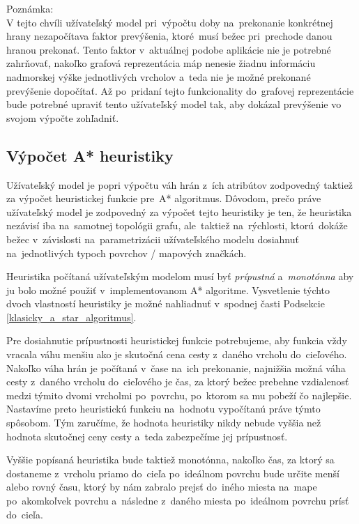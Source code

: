 Poznámka:\\
V tejto chvíli užívateľský model pri~výpočtu doby na~prekonanie konkrétnej hrany nezapočítava faktor prevýšenia, ktoré~musí bežec pri~prechode danou hranou prekonať. Tento faktor v~aktuálnej podobe aplikácie nie je potrebné zahrňovať, nakoľko grafová reprezentácia máp nenesie žiadnu informáciu nadmorskej výške jednotlivých vrcholov a~teda nie je možné prekonané prevýšenie dopočítať. Až po~pridaní tejto funkcionality do~grafovej reprezentácie bude potrebné upraviť tento užívateľský model tak, aby dokázal prevýšenie vo svojom výpočte zohľadniť.  

\subsection{Výpočet A* heuristiky}\label{vypocet_a_star_heuristiky}

Užívateľský model je popri výpočtu váh hrán z~ích atribútov zodpovedný taktiež za výpočet heuristickej funkcie pre~A* algoritmus. Dôvodom, prečo práve užívateľský model je zodpovedný za výpočet tejto heuristiky je ten, že heuristika nezávisí iba na~samotnej topológii grafu, ale~taktiež na~rýchlosti, ktorú~dokáže bežec v~závislosti na~parametrizácii užívateľského modelu dosiahnuť na~jednotlivých typoch povrchov / mapových značkách.

Heuristika počítaná užívateľským modelom musí byť \textit{prípustná} a~\textit{monotónna} aby ju bolo možné použiť v~implementovanom A* algoritme. Vysvetlenie týchto dvoch vlastností heuristiky je možné nahliadnuť v~spodnej časti Podsekcie \ref{klasicky_a_star_algoritmus}. 

Pre dosiahnutie prípustnosti heuristickej funkcie potrebujeme, aby funkcia vždy vracala váhu menšiu ako je skutočná cena cesty z~daného vrcholu do~cieľového. Nakoľko váha hrán je počítaná v~čase na~ich prekonanie, najnižšia možná váha cesty z~daného vrcholu do~cieľového je čas, za ktorý bežec prebehne vzdialenosť medzi týmito dvomi vrcholmi po~povrchu, po~ktorom sa mu pobeží čo najlepšie. Nastavíme preto heuristickú funkciu na~hodnotu vypočítanú práve týmto spôsobom. Tým zaručíme, že hodnota heuristiky nikdy nebude vyššia než hodnota skutočnej ceny cesty a~teda zabezpečíme jej prípustnosť.

Vyššie popísaná heuristika bude taktiež monotónna, nakoľko čas, za ktorý sa dostaneme z~vrcholu priamo do~cieľa po~ideálnom povrchu bude určite menší alebo rovný času, ktorý by nám zabralo prejsť do~iného miesta na~mape po~akomkoľvek povrchu a~následne z~daného miesta po~ideálnom povrchu prísť do~cieľa.  

